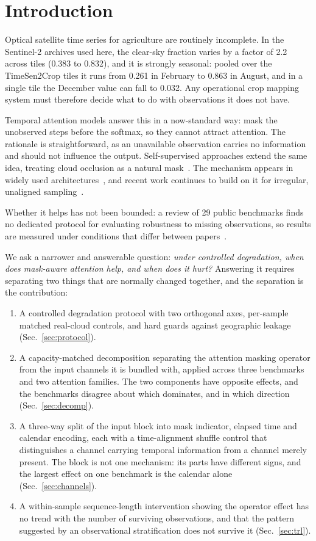 \documentclass[journal]{IEEEtran}
\begin{document}
\section{Introduction}

Optical satellite time series for agriculture are routinely incomplete. In the
Sentinel-2 archives used here, the clear-sky fraction varies by a factor of 2.2
across tiles (0.383 to 0.832), and it is strongly seasonal: pooled over the
TimeSen2Crop tiles it runs from 0.261 in February to 0.863 in August, and in a
single tile the December value can fall to 0.032. Any operational crop mapping
system must therefore decide what to do with observations it does not have.

Temporal attention models answer this in a now-standard way: mask the
unobserved steps before the softmax, so they cannot attract attention. The
rationale is straightforward, as an unavailable observation carries no
information and should not influence the output. Self-supervised approaches
extend the same idea, treating cloud occlusion as a natural mask~\cite{mae}.
The mechanism appears in widely used architectures~\cite{ltae,tsvit,alise}, and
recent work continues to build on it for irregular, unaligned
sampling~\cite{alise,shaping}.

Whether it helps has not been bounded: a review of 29 public benchmarks finds no
dedicated protocol for evaluating robustness to missing observations, so results
are measured under conditions that differ between papers~\cite{sitsreview}.

We ask a narrower and answerable question: \emph{under controlled degradation,
when does mask-aware attention help, and when does it hurt?} Answering it
requires separating two things that are normally changed together, and the
separation is the contribution:
\begin{enumerate}
\item A controlled degradation protocol with two orthogonal axes, per-sample
matched real-cloud controls, and hard guards against geographic leakage
(Sec.~\ref{sec:protocol}).
\item A capacity-matched decomposition separating the attention masking
operator from the input channels it is bundled with, applied across three
benchmarks and two attention families. The two components have opposite effects,
and the benchmarks disagree about which dominates, and in which direction
(Sec.~\ref{sec:decomp}).
\item A three-way split of the input block into mask indicator, elapsed time and
calendar encoding, each with a time-alignment shuffle control that distinguishes
a channel carrying temporal information from a channel merely present. The
block is not one mechanism: its parts have different signs, and the largest
effect on one benchmark is the calendar alone (Sec.~\ref{sec:channels}).
\item A within-sample sequence-length intervention showing the operator effect
has no trend with the number of surviving observations, and that the pattern
suggested by an observational stratification does not survive it
(Sec.~\ref{sec:trl}).
\end{enumerate}
\end{document}
